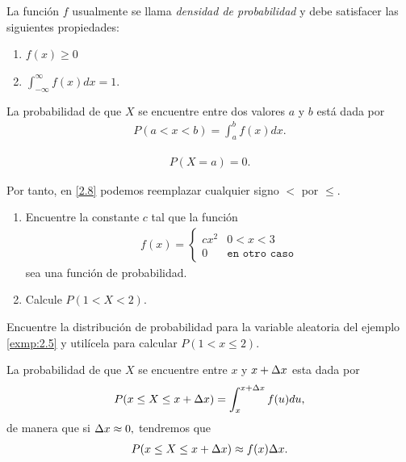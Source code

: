 	La función $f$ usualmente se llama \emph{densidad de probabilidad} y debe satisfacer las siguientes propiedades:
	\begin{enumerate}
		\item $f(x)\geq 0 $
		\item $\displaystyle \int_{-\infty}^{\infty}f(x)dx=1.$
	\end{enumerate}




	La probabilidad de que $X$ se encuentre entre dos valores $a$ y $b$ está dada por
	\begin{align}
		\label{2.8}
		P(a < x <b)=\int_{a}^{b}f(x)dx.
	\end{align}



	\begin{align}
		\label{exmp:2.4}
		P(X=a)=0.
	\end{align}


Por tanto, en \eqref{2.8} podemos reemplazar cualquier signo $<$ por $\leq.$


	\begin{ejemplo}
		\label{exmp:2.5}
		\begin{enumerate}
			\item Encuentre la constante $c$ tal que la función
			\begin{align}
				f(x)=
				\begin{cases}
					cx^{2} & 0 < x < 3 \\
					0 & \texttt{en otro caso}
				\end{cases}
			\end{align}
			sea una función de probabilidad. 
			\item Calcule $P(1 < X < 2).$
		\end{enumerate}

	\end{ejemplo}



	\begin{ejemplo}
	  \label{exmp:2.6}
	  Encuentre la distribución de probabilidad para la variable aleatoria del ejemplo
	  \ref{exmp:2.5} y utilícela para calcular $P(1 < x \leq 2).$
	\end{ejemplo}



	La probabilidad de que $X$ se encuentre entre $x$ y $x+\Delta x$ esta dada por
	\begin{align}
		\label{2.9}
		P(x \leq X \leq x+\Delta x)= \int_{x}^{x+\Delta x}f(u)du,
	\end{align} 
	de manera que si $\Delta x \approx 0,$ tendremos que
	\begin{align}
		\label{2.10}
		P(x \leq X \leq x+\Delta x)\approx f(x) \Delta x.
	\end{align}



